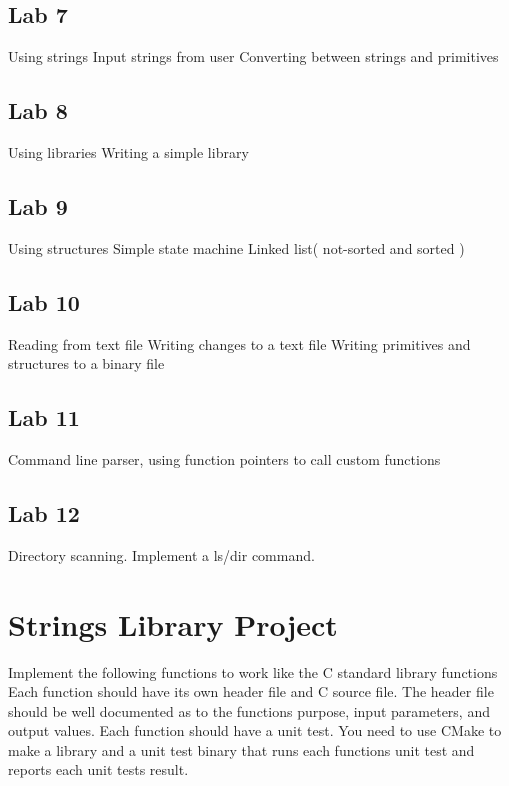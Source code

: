 \documentclass[a4paper,12pt]{report}
\begin{document}
\subsection*{Lab 7}
Using strings
Input strings from user
Converting between strings and primitives

\subsection*{Lab 8}
Using libraries
Writing a simple library

\subsection*{Lab 9}
Using structures 
Simple state machine
Linked list( not-sorted and sorted )

\subsection*{Lab 10}
Reading from text file
Writing changes to a text file
Writing primitives and structures to a binary file

\subsection*{Lab 11}
Command line parser, using function pointers to call custom functions

\subsection*{Lab 12}
Directory scanning.  Implement a ls/dir command.


\pagebreak
\section*{Strings Library Project}
Implement the following functions to work like the C standard library functions  Each function should have its own header file and C source file.  The header file should be well documented as to the functions purpose, input parameters, and output values.  Each function should have a unit test.  You need to use CMake to make a library and a unit test binary that runs each functions unit test and reports each unit tests result.
\end{document}
